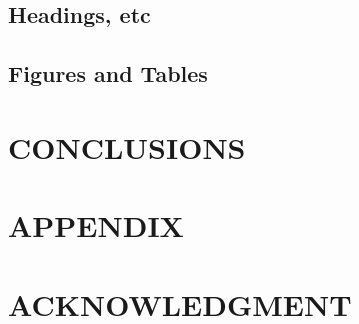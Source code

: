 \documentclass[letterpaper, 10 pt, conference]{ieeeconf}  %
\begin{document}
\subsection{Headings, etc}

 

\subsection{Figures and Tables}

 
 
\section{CONCLUSIONS}



\addtolength{\textheight}{-12cm}   %
 
\section*{APPENDIX}

\section*{ACKNOWLEDGMENT}

\printbibliography

 
\end{document}
